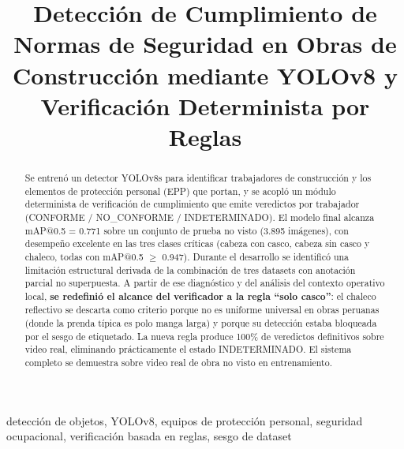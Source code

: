 \documentclass[conference]{IEEEtran}
\begin{document}
\title{Detección de Cumplimiento de Normas de Seguridad en Obras de
Construcción mediante YOLOv8 y Verificación Determinista por Reglas}

\author{
}

\maketitle

\begin{abstract}
Se entrenó un detector YOLOv8s para identificar trabajadores de construcción
y los elementos de protección personal (EPP) que portan, y se acopló un módulo
determinista de verificación de cumplimiento que emite veredictos por
trabajador (CONFORME / NO\_CONFORME / INDETERMINADO). El modelo final
alcanza mAP@0.5 = 0.771 sobre un conjunto de prueba no visto (3.895
imágenes), con desempeño excelente en las tres clases críticas (cabeza con
casco, cabeza sin casco y chaleco, todas con mAP@0.5 $\geq$ 0.947). Durante
el desarrollo se identificó una limitación estructural derivada de la
combinación de tres datasets con anotación parcial no superpuesta.
A partir de ese diagnóstico y del análisis del contexto operativo local,
\textbf{se redefinió el alcance del verificador a la regla ``solo casco''}:
el chaleco reflectivo se descarta como criterio porque no es uniforme
universal en obras peruanas (donde la prenda típica es polo manga larga)
y porque su detección estaba bloqueada por el sesgo de etiquetado.
La nueva regla produce 100\% de veredictos definitivos sobre video real,
eliminando prácticamente el estado INDETERMINADO. El sistema completo se
demuestra sobre video real de obra no visto en entrenamiento.
\end{abstract}

\begin{IEEEkeywords}
detección de objetos, YOLOv8, equipos de protección personal,
seguridad ocupacional, verificación basada en reglas, sesgo de dataset
\end{IEEEkeywords}
\end{document}
